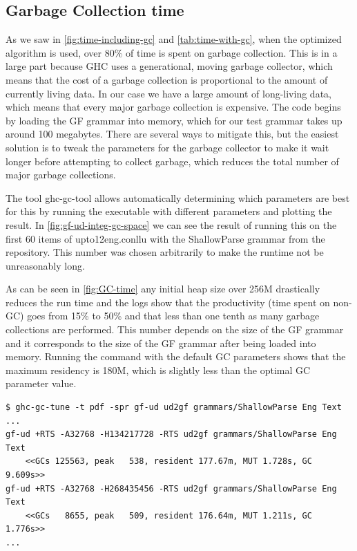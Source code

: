 \subsection{Garbage Collection time}\label{sect:gc-time}
As we saw in \autoref{fig:time-including-gc} and \autoref{tab:time-with-gc}, when the optimized algorithm is used, over 80\% of time is spent on garbage collection. This is in a large part because GHC uses a generational, moving garbage collector\cite{ungar1984generation}, which means that the cost of a garbage collection is proportional to the amount of currently living data. %
In our case we have a large amount of long-living data, which means that every major garbage collection is expensive. The code begins by loading the GF grammar into memory, which for our test grammar takes up around 100 megabytes. There are several ways to mitigate this, but the easiest solution is to tweak the parameters for the garbage collector to make it wait longer before attempting to collect garbage, which reduces the total number of major garbage collections.

The tool ghc-gc-tool allows automatically determining which parameters are best for this by running the executable with different parameters and plotting the result. In \autoref{fig:gf-ud-integ-gc-space} we can see the result of running this on the first 60 items of upto12eng.conllu with the ShallowParse grammar from the repository. This number was chosen arbitrarily to make the runtime not be unreasonably long. 

As can be seen in \autoref{fig:GC-time} any initial heap size over 256M drastically reduces the run time and the logs show that the productivity (time spent on non-GC) goes from 15\% to 50\% and that less than one tenth as many garbage collections are performed. This number depends on the size of the GF grammar and it corresponds to the size of the GF grammar after being loaded into memory. Running the command with the default GC parameters shows that the maximum residency is 180M, which is slightly less than the optimal GC parameter value.

\begin{verbatim}
$ ghc-gc-tune -t pdf -spr gf-ud ud2gf grammars/ShallowParse Eng Text
...
gf-ud +RTS -A32768 -H134217728 -RTS ud2gf grammars/ShallowParse Eng Text
    <<GCs 125563, peak   538, resident 177.67m, MUT 1.728s, GC 9.609s>>
gf-ud +RTS -A32768 -H268435456 -RTS ud2gf grammars/ShallowParse Eng Text
    <<GCs   8655, peak   509, resident 176.64m, MUT 1.211s, GC 1.776s>>
...
\end{verbatim}

